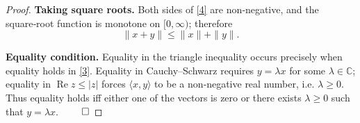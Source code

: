 \begin{proof}
\medskip

\textbf{Taking square roots.}  
Both sides of \eqref{4} are non‑negative, and the square‑root function is monotone on \([0,\infty)\); therefore
\[
\|x+y\|\le \|x\|+\|y\|.
\]

\medskip

\textbf{Equality condition.}  
Equality in the triangle inequality occurs precisely when equality holds in \eqref{3}.  
Equality in Cauchy–Schwarz requires \(y=\lambda x\) for some \(\lambda\in\mathbb C\); equality in \(\operatorname{Re}z\le|z|\) forces \(\langle x,y\rangle\) to be a non‑negative real number, i.e. \(\lambda\ge0\).  
Thus equality holds iff either one of the vectors is zero or there exists \(\lambda\ge0\) such that \(y=\lambda x\). \(\qed\)
\end{proof}